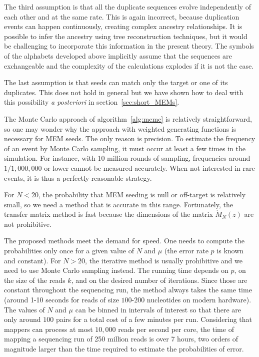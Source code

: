 \documentclass{article}
\begin{document}
The third assumption is that all the duplicate sequences evolve
independently of each other and at the same rate. This is again incorrect,
because duplication events can happen continuously, creating complex
ancestry relationships. It is possible to infer the ancestry using tree
reconstruction techniques, but it would be challenging to incorporate this
information in the present theory. The symbols of the alphabets developed
above implicitly assume that the sequences are exchangeable and the
complexity of the calculations explodes if it is not the case.

The last assumption is that seeds can match only the target or one of its
duplicates. This does not hold in general but we have shown how to deal
with this possibility \textit{a posteriori} in
section~\ref{sec:short_MEMs}.

The Monte Carlo approach of algorithm~\ref{alg:mcmc} is relatively
straightforward, so one may wonder why the approach with weighted
generating functions is necessary for MEM seeds. The only reason is
precision. To estimate the frequency of an event by Monte Carlo sampling,
it must occur at least a few times in the simulation. For instance, with
10 million rounds of sampling, frequencies around $1/1,000,000$ or lower
cannot be measured accurately. When not interested in rare events, it is
thus a perfectly reasonable strategy.

For $N < 20$, the probability that MEM seeding is null or off-target is
relatively small, so we need a method that is accurate in this range.
Fortunately, the transfer matrix method is fast because the dimensions of
the matrix $\mathring{M}_N(z)$ are not prohibitive.

The proposed methods meet the demand for speed. One needs to compute the
probabilities only once for a given value of $N$ and $\mu$ (the error rate
$p$ is known and constant). For $N > 20$, the iterative method is usually
prohibitive and we need to use Monte Carlo sampling instead. The running
time depends on $p$, on the size of the reads $k$, and on the desired
number of iterations. Since those are constant throughout the sequencing
run, the method always takes the same time (around 1-10 seconds for reads
of size $100$-$200$ nucleotides on modern hardware). The values of $N$ and
$\mu$ can be binned in intervals of interest so that there are only around
$100$ pairs for a total cost of a few minutes per run. Considering that
mappers can process at most $10,000$ reads per second per core, the time
of mapping a sequencing run of 250 million reads is over 7 hours, two
orders of magnitude larger than the time required to estimate the
probabilities of error.
\end{document}
